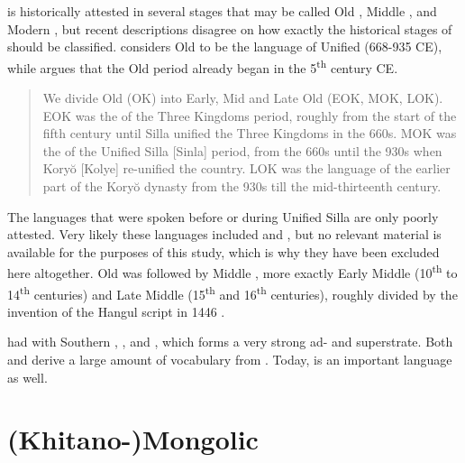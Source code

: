  is historically attested in several stages that may be called Old , Middle , and Modern , but recent descriptions disagree on how exactly the historical stages of  should be classified. \citet{Whitman2015} considers Old  to be the language of Unified  (668-935 CE), while \citet[41]{Nam2012} argues that the Old  period already began in the 5\textsuperscript{th} century CE.

\begin{quote}
We divide Old  (OK) into Early, Mid and Late Old  (EOK, MOK, LOK). EOK was the  of the Three Kingdoms period, roughly from the start of the fifth century until Silla unified the Three Kingdoms in the 660s. MOK was the  of the Unified Silla [Sinla] period, from the 660s until the 930s when Koryŏ [Kolye] re-unified the country. LOK was the language of the earlier part of the Koryŏ dynasty from the 930s till the mid-thirteenth century.
\end{quote}

\noindent The languages that were spoken before or during Unified Silla are only poorly attested. Very likely these languages included  and , but no relevant material is available for the purposes of this study, which is why they have been excluded here altogether. Old  was followed by Middle , more exactly Early Middle  (10\textsuperscript{th} to 14\textsuperscript{th} centuries) and Late Middle  (15\textsuperscript{th} and 16\textsuperscript{th} centuries), roughly divided by the invention of the Hangul script in 1446 \citep{Sohn2012}.

 had  with Southern , , and , which forms a very strong ad- and superstrate. Both  and  derive a large amount of vocabulary from . Today,  is an important  language as well.

\section{(Khitano-)Mongolic}\label{sec:2.8}


